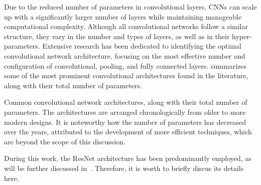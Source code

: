 Due to the reduced number of parameters in convolutional layers, CNNs can scale
up with a significantly larger number of layers while maintaining manageable
computational complexity. Although all convolutional networks follow a similar
structure, they vary in the number and types of layers, as well as in their
hyper-parameters. Extensive research has been dedicated to identifying the
optimal convolutional network architecture, focusing on the most effective
number and configuration of convolutional, pooling, and fully connected layers.
 summarizes some of the most prominent convolutional architectures
found in the literature, along with their total number of parameters.
\begin{margintable} %
    \caption[Common Convolutional Network Architectures]{
    Common convolutional network architectures, along with their total number of
    parameters. The architectures are arranged chronologically from older to
    more modern designs. It is noteworthy how the number of parameters has
    decreased over the years, attributed to the development of more efficient
    techniques, which are beyond the scope of this discussion.
    }
\end{margintable}
During this work, the ResNet  architecture has been
predominantly employed, as will be further discussed in~.
Therefore, it is worth to briefly discus its details here.

